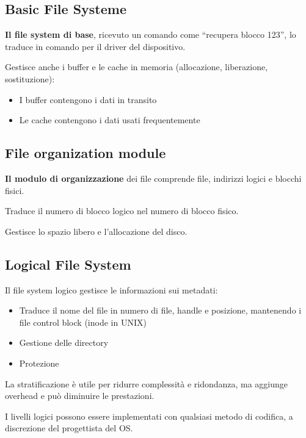 \subsection{Basic File Systeme}

\textbf{Il file system di base}, ricevuto un comando come “recupera blocco 123”, lo traduce in comando per il driver del dispositivo.

Gestisce anche i buffer e le cache in memoria (allocazione, liberazione, sostituzione):
\begin{itemize}
  \item I buffer contengono i dati in transito
  \item Le cache contengono i dati usati frequentemente
\end{itemize}





\subsection{File organization module}

\textbf{Il modulo di organizzazione} dei file comprende file, indirizzi logici e blocchi fisici.

Traduce il numero di blocco logico nel numero di blocco fisico.

Gestisce lo spazio libero e l'allocazione del disco.







\subsection{Logical File System}
Il file system logico gestisce le informazioni sui metadati:

\begin{itemize}
  \item Traduce il nome del file in numero di file, handle e posizione, mantenendo i file control block (inode in UNIX)
  \item Gestione delle directory
  \item Protezione
\end{itemize}

La stratificazione è utile per ridurre complessità e ridondanza,
ma aggiunge overhead e può diminuire le prestazioni.

I livelli logici possono essere implementati con qualsiasi metodo di codifica, a discrezione del progettista del OS.

